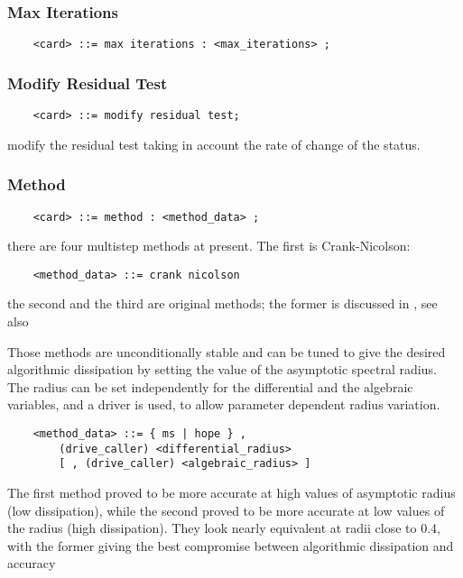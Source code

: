 \subsubsection{Max Iterations}
\begin{verbatim}
    <card> ::= max iterations : <max_iterations> ;
\end{verbatim}

\subsubsection{Modify Residual Test}
\begin{verbatim}
    <card> ::= modify residual test;
\end{verbatim}
modify the residual test taking in account the rate of change of the status.

\subsubsection{Method}
\begin{verbatim}
    <card> ::= method : <method_data> ;
\end{verbatim}
there are four multistep methods at present. 
The first is Crank-Nicolson:
\begin{verbatim}
    <method_data> ::= crank nicolson
\end{verbatim}
the second and the third are original 
methods; the former is discussed in \cite{MASARATI-LANZ-MANTEGAZZA-2001},
see also
\begin{quote}
\end{quote} 
Those methods are unconditionally stable and can be tuned to give 
the desired algorithmic dissipation
by setting the value of the asymptotic spectral radius.
The radius can be set independently for the differential
and the algebraic variables, and a driver is used, to allow parameter 
dependent radius variation.
\begin{verbatim}
    <method_data> ::= { ms | hope } ,
        (drive_caller) <differential_radius>
        [ , (drive_caller) <algebraic_radius> ]
\end{verbatim}
The first method proved to be more accurate at high values of asymptotic
radius (low dissipation), while the second proved to be more accurate
at low values of the radius (high dissipation).
They look nearly equivalent at radii close to 0.4, with the former
giving the best compromise between algorithmic dissipation and accuracy 
